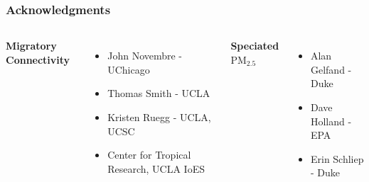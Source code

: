 \documentclass[t]{beamer}\usepackage[]{graphicx}\usepackage[]{color}
\newcommand{\PM}{$\text{PM}_{2.5}$ }
\begin{document}
\begin{frame}
\frametitle{Acknowledgments}

\vfill

\begin{columns}[t]
\textbf{Migratory Connectivity}
\vspace{5mm}
\begin{itemize}
  \item John Novembre - UChicago
  \vspace{3mm} \item Thomas Smith - UCLA
  \vspace{3mm} \item Kristen Ruegg - UCLA, UCSC
  \vspace{3mm} \item Center for Tropical Research, UCLA IoES
\end{itemize}

\textbf{Speciated \PM}
\vspace{2.5mm}
\begin{itemize}
  \item Alan Gelfand - Duke
  \vspace{3mm} \item Dave Holland - EPA
  \vspace{3mm} \item Erin Schliep - Duke
\end{itemize}
\end{columns}

\vfill

\end{frame}


\appendix


\begin{frame}
    


\end{frame}

\end{document}
